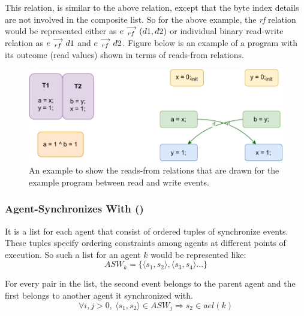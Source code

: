             This relation, is similar to the above relation, except that the byte index details are not involved in the composite list. So for the above example, the \textit{rf} relation would be represented either as   
                $e\stackrel{\longrightarrow}{_{rf}}(d1, d2)$
            or individual binary read-write relation as 
                $e\stackrel{\longrightarrow}{_{rf}}d1$ and $e\stackrel{\longrightarrow}{_{rf}}d2$.
            Figure below is an example of a program with its outcome (read values) shown in terms of reads-from relations. 
            \begin{figure}[H]
                \centering
                \includegraphics[scale=0.7]{ECMAScriptMemoryModel/ReadsFrom.pdf}
                \caption{An example to show the reads-from relations that are drawn for the example program between read and write events.}
                \label{read-from}
            \end{figure}
            
        \subsubsection{Agent-Synchronizes With ()}
        
            It is a list for each agent that consist of ordered tuples of synchronize events. These tuples specify ordering constraints among agents at different points of execution. So such a list for an agent $k$ would be represented like:  
                \[ASW_k = \{ \langle s_1, s_2 \rangle, \langle s_3, s_4 \rangle ...\}\]
        
            For every pair in the list, the second event belongs to the parent agent and the first belongs to another agent it synchronized with\footnotemark.
                \[  
                    \forall{i,j>0},\ 
                    \langle s_1, s_2 \rangle \in ASW_j 
                    \Rightarrow{} 
                    s_2 \in ael(k)                        
                \]


